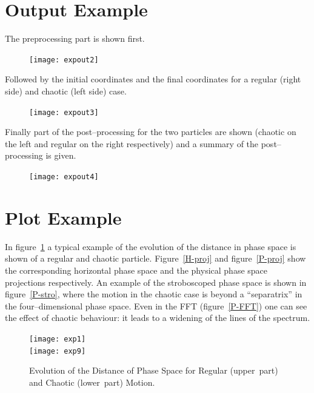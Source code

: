 \documentclass[a4paper,11pt]{report}
\begin{document}
\clearpage

\section{Output Example} \label{output}

The preprocessing part is shown first.
\begin{figure}[H]\vspace{-5mm}
\begin{center}
  \mbox{\texttt{[image: expout2]}}
\end{center}
\end{figure}
Followed by the initial coordinates and the final coordinates for a
regular (right side) and chaotic (left side) case.
\begin{figure}[H]\vspace{-5mm}
\begin{center}
  \mbox{\texttt{[image: expout3]}}
\end{center}
\end{figure}

\clearpage

Finally part of the post--processing for the two particles are shown
(chaotic on the left and regular on the right respectively) and a
summary of the post--processing is given.
\begin{figure}[H]
\begin{center}
  \mbox{\texttt{[image: expout4]}}
\end{center}
\end{figure}

\clearpage

\section{Plot Example} \label{plots}

{\small In figure~\ref{Lya} a typical example of the evolution of the
  distance in phase space is shown of a regular and chaotic particle.
  Figure~\ref{H-proj} and figure~\ref{P-proj} show the corresponding
  horizontal phase space and the physical phase space projections
  respectively. An example of the stroboscoped phase space is shown in
  figure~\ref{P-stro}, where the motion in the chaotic case is beyond
  a ``separatrix'' in the four--dimensional phase space. Even in the
  FFT (figure~\ref{P-FFT}) one can see the effect of chaotic
  behaviour: it leads to a widening of the lines of the spectrum.}
\begin{figure}[H] \vspace*{-5mm}
\begin{center}
  \mbox{\texttt{[image: exp1]}}
  \\[5mm]
  \mbox{\texttt{[image: exp9]}}
 \caption{\small Evolution of the Distance of Phase Space for Regular
   \mbox{(upper part)} and Chaotic \mbox{(lower part)} Motion.}
 \label{Lya}
\end{center}
\end{figure} 
\end{document}
